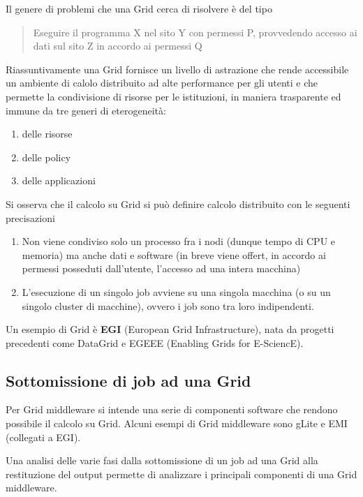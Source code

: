\documentclass[italian,]{article}
\providecommand{\tightlist}{%
  \setlength{\itemsep}{0pt}\setlength{\parskip}{0pt}}
\begin{document}
Il genere di problemi che una Grid cerca di risolvere è del tipo

\begin{quote}
Eseguire il programma X nel sito Y con permessi P, provvedendo accesso
ai dati sul sito Z in accordo ai permessi Q
\end{quote}

Riassuntivamente una Grid fornisce un livello di astrazione che rende
accessibile un ambiente di calolo distribuito ad alte performance per
gli utenti e che permette la condivisione di risorse per le istituzioni,
in maniera trasparente ed immune da tre generi di eterogeneità:

\begin{enumerate}
\def\labelenumi{\arabic{enumi}.}
\tightlist
\item
  delle risorse
\item
  delle policy
\item
  delle applicazioni
\end{enumerate}

Si osserva che il calcolo su Grid si può definire calcolo distribuito
con le seguenti precisazioni

\begin{enumerate}
\def\labelenumi{\arabic{enumi}.}
\tightlist
\item
  Non viene condiviso solo un processo fra i nodi (dunque tempo di CPU e
  memoria) ma anche dati e software (in breve viene offert, in accordo
  ai permessi posseduti dall'utente, l'accesso ad una intera macchina)
\item
  L'esecuzione di un singolo job avviene su una singola macchina (o su
  un singolo cluster di macchine), ovvero i job sono tra loro
  indipendenti.
\end{enumerate}

Un esempio di Grid è \textbf{EGI} (European Grid Infrastructure), nata
da progetti precedenti come DataGrid e EGEEE (Enabling Grids for
E-SciencE).

\subsection{Sottomissione di job ad una
Grid}\label{sottomissione-di-job-ad-una-grid}

Per Grid middleware si intende una serie di componenti software che
rendono possibile il calcolo su Grid. Alcuni esempi di Grid middleware
sono gLite e EMI (collegati a EGI).

Una analisi delle varie fasi dalla sottomissione di un job ad una Grid
alla restituzione del output permette di analizzare i principali
componenti di una Grid middleware.
\end{document}
